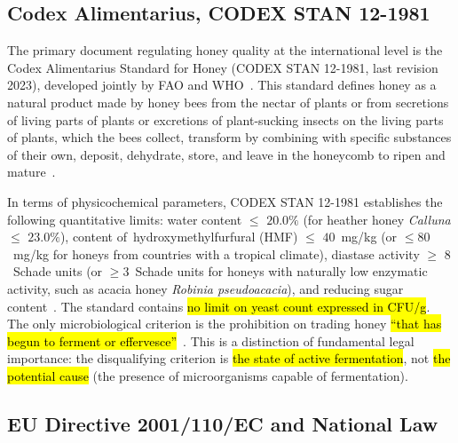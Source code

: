 \documentclass[foods,review,accept,pdftex,moreauthors]{Definitions/mdpi}
\begin{document}
\subsection{Codex Alimentarius, CODEX STAN 12-1981}

The primary document regulating honey quality at the international
level is the Codex Alimentarius Standard for Honey
({CODEX STAN 12-1981,}  last revision 2023), developed jointly
by FAO and WHO~\cite{codex_stan12}. This standard defines honey
as a natural product made by honey bees from the nectar of plants
or from secretions of living parts of plants or excretions of
plant-sucking insects on the living parts of plants, which the bees
collect, transform by combining with specific substances of their own,
deposit, dehydrate, store, and leave in the honeycomb to ripen and
mature~\cite{codex_stan12}.

In terms of physicochemical parameters, CODEX STAN 12-1981 establishes
the following quantitative limits: water content $\leq$ $20.0\%$
(for heather honey \textit{{Calluna}} $\leq$ $23.0\%$), content
of~hydroxymethylfurfural (HMF) $\leq$ $40$~mg/kg (or $\leq$$80$~mg/kg
for honeys from countries with a tropical climate), diastase
activity $\geq$ $8$~Schade units (or $\geq$$3$~Schade units for honeys
with naturally low enzymatic activity, such as acacia honey
\textit{Robinia pseudoacacia}), and reducing sugar
content~\cite{codex_stan12}. The standard contains \hl{no 
 limit
on yeast count expressed in CFU/g}. The only microbiological criterion
is the prohibition on trading honey \hl{``that has begun to ferment
or effervesce''}~\cite{codex_stan12}. This is a distinction of
fundamental legal importance: the disqualifying criterion is
\hl{the state of active fermentation}, not \hl{the potential
cause} (the presence of microorganisms capable of fermentation).

\subsection{EU Directive 2001/110/EC and National Law}
\end{document}
